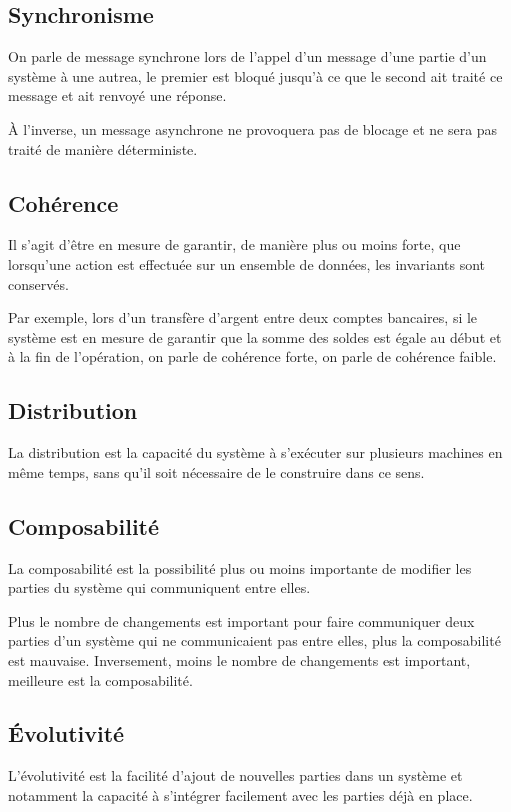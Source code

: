 \documentclass{article}
\begin{document}
\subsection{Synchronisme}
On parle de message synchrone lors de l'appel d'un message d'une partie d'un système
à une autrea,  le premier est bloqué jusqu'à ce que le second ait traité ce message
et ait renvoyé une réponse.

À l'inverse, un message asynchrone ne provoquera pas de blocage et ne sera pas
traité de manière déterministe.

\subsection{Cohérence}
Il s'agit d'être en mesure de garantir, de manière plus ou moins forte, que lorsqu'une
action est effectuée sur un ensemble de données, les invariants sont conservés.

Par exemple, lors d'un transfère d'argent entre deux comptes bancaires, si le système
est en mesure de garantir que la somme des soldes est égale au début et à la fin
de l'opération, on parle de cohérence forte, on parle de cohérence faible.

\subsection{Distribution}
La distribution est la capacité du système à s'exécuter sur plusieurs machines en
même temps, sans qu'il soit nécessaire de le construire dans ce sens.

\subsection{Composabilité}
La composabilité est la possibilité plus ou moins importante de modifier les parties
du système qui communiquent entre elles.

Plus le nombre de changements est important pour faire communiquer deux parties
d'un système qui ne communicaient pas entre elles, plus la composabilité est mauvaise.
Inversement, moins le nombre de changements est important, meilleure est la composabilité.

\subsection{Évolutivité}
L'évolutivité est la facilité d'ajout de nouvelles parties dans un système et notamment
la capacité à s'intégrer facilement avec les parties déjà en place.
\end{document}
